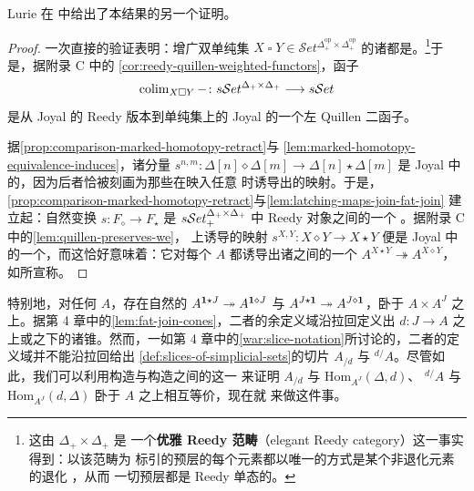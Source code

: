 Lurie 在 \cite[4.2.1.2]{bib78} 中给出了本结果的另一个证明。

\begin{proof}
一次直接的验证表明：增广双单纯集
$X\mathbin{\square}Y\in\mathcal{S}et^{\Delta_{+}^{\mathrm{op}}\times\Delta_{+}^{\mathrm{op}}}$
的诸\trLatchingMap{}都是\trMonomorphism。\footnote{这由 $\Delta_{+}\times\Delta_{+}$ 是
一个\textbf{优雅 Reedy 范畴}（elegant Reedy category）这一事实得到：以该范畴为
标引的预层的每个元素都以唯一的方式是某个非退化元素的退化 \cite{bib16}，从而
一切预层都是 Reedy 单态的。}于是，据附录 C 中的%
\cref{cor:reedy-quillen-weighted-functors}，\trWeightedColimit{}函子
\begin{equation*}
\operatorname{colim}_{X\mathbin{\square}Y}-\colon
s\mathcal{S}et^{\Delta_{+}\times\Delta_{+}}\longrightarrow s\mathcal{S}et
\end{equation*}
是从 Joyal \trModelStructure{}的 Reedy 版本到单纯集上的 Joyal
\trModelStructure{}的一个左 Quillen 二函子。

据\cref{prop:comparison-marked-homotopy-retract}与%
\cref{lem:marked-homotopy-equivalence-induces}，诸分量
$s^{n,m}\colon\Delta[n]\diamond\Delta[m]\to\Delta[n]\star\Delta[m]$ 是 Joyal
\trModelStructure{}中的\trWeakEquivalence，因为后者恰被刻画为那些在映入任意%
\trQuasiCategory{}时诱导出\trEquivalence{}的映射。于是，%
\cref{prop:comparison-marked-homotopy-retract}与\cref{lem:latching-maps-join-fat-join}
建立起：自然变换 $s\colon F_{\diamond}\to F_{\star}$ 是
$s\mathcal{S}et_{+}^{\Delta_{+}\times\Delta_{+}}$ 中 Reedy \trCofibrant{}对象之间的一个%
\trPointwise{}\trWeakEquivalence。据附录 C 中的\cref{lem:quillen-preserves-we}，
\trWeightedColimit{}上诱导的映射 $s^{X,Y}\colon X\diamond Y\to X\star Y$ 便是 Joyal
\trModelStructure{}中的一个\trWeakEquivalence，而这恰好意味着：它对每个%
\trQuasiCategory{} $A$ 都诱导出诸\trQuasiCategory{}之间的一个\trEquivalence
$A^{X\star Y}\twoheadrightarrow A^{X\diamond Y}$，如所宣称。
\end{proof}

特别地，对任何\trQuasiCategory{} $A$，存在自然的\trEquivalence
$A^{\mathbf{1}\star J}\twoheadrightarrow A^{\mathbf{1}\diamond J}$ 与
$A^{J\star\mathbf{1}}\twoheadrightarrow A^{J\diamond\mathbf{1}}$，卧于 $A\times A^{J}$
之上。据第 4 章中的\cref{lem:fat-join-cones}，二者的余定义域沿拉回定义出%
\trDiagram{} $d\colon J\to A$ 之上或之下的诸锥\trQuasiCategory。然而，一如第 4
章中的\cref{war:slice-notation}所讨论的，二者的定义域并不能沿拉回给出
\cref{def:slices-of-simplicial-sets}的切片\trQuasiCategory{} $A_{/d}$ 与
${}^{d/}\!A$。尽管如此，我们可以利用\trJoin{}构造与\trFatJoin{}构造之间的这一%
\trEquivalence{}来证明 $A_{/d}$ 与 $\mathrm{Hom}_{A^{J}}(\Delta,d)$、%
${}^{d/}\!A$ 与 $\mathrm{Hom}_{A^{J}}(d,\Delta)$ 卧于 $A$ 之上相互等价，现在就
来做这件事。

